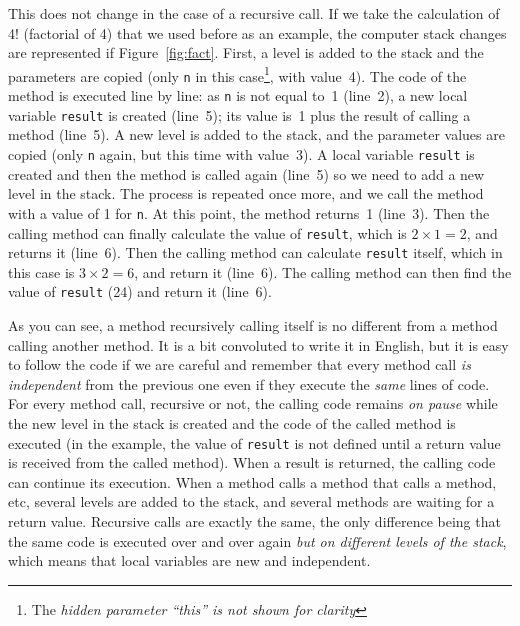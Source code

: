 This does not change in the case of a recursive call. If we take the
calculation of 4! (factorial of 4) that we used before as an example, 
the computer stack changes are
represented if Figure~\ref{fig:fact}. First, a level is added to the
stack and the parameters are copied (only \verb+n+ in this 
case\footnote{The \emph{hidden parameter ``this'' is not 
shown for clarity}}, with
value~4). The code of the method is executed line by line: as \verb+n+
is not equal to~1 (line~2), 
a new local variable \verb+result+ is created (line~5); its value
is~1 plus the result of calling a method (line~5). 
A new level is added to the
stack, and the parameter values are copied (only \verb+n+ again, but
this time with value~3). A local variable \verb+result+ is created and
then the method is called again (line~5) 
so we need to add a new level in the
stack. The process is repeated once more, and we call the method with
a value of 1 for \verb+n+. At this point, 
the method returns~1 (line~3). Then
the calling method can finally calculate the value of \verb+result+,
which is $2 \times 1 = 2$, and returns it (line~6). 
Then the calling method can
calculate \verb+result+ itself, which in this case is $3 \times 2 = 6$,
and return it (line~6). The calling method can then find the value of
\verb+result+ (24) and return it (line~6). 

As you can see, a method recursively calling itself is no different
from a method calling another method. It is a bit convoluted to write
it in English, but it is easy to follow the code if we are careful and
remember that every method call \emph{is independent} from the previous one
even if they execute the \emph{same} lines of code. 
For every method call, recursive
or not, the calling code remains \emph{on pause} while the new level
in the stack is created and the code of the called method is
executed (in the example, the value of \verb+result+ is not defined until a
return value is received from the called method). 
When a result is returned, the calling code can continue its
execution. When a method calls a method that calls a method, etc,
several levels are added to the stack, and several methods are waiting
for a return value. Recursive calls are exactly the same, the only
difference being that the same code is executed over and over again
\emph{but on different levels of the stack}, which means that local
variables are new and independent. 

